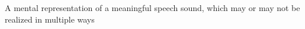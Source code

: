 A mental representation of a meaningful speech sound, which may or may not be realized in multiple ways
